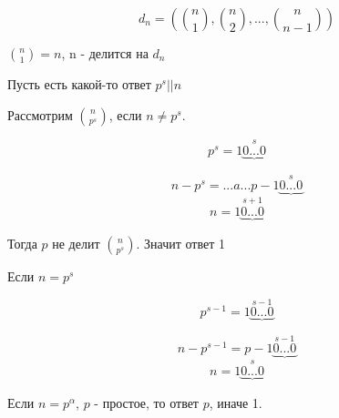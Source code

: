 
$$d_n = \left(\binom{n}{1}, \binom{n}{2}, ..., \binom{n}{n - 1}\right)$$

$\binom{n}{1} = n$, n - делится на $d_n$

Пусть есть какой-то ответ $p^s||n$

Рассмотрим $\binom{n}{p^s}$, если $n \neq p^s$.

$$p^s = 1\underbrace{0...0}^{s}$$

$$n - p^s = ... a ... p - 1\underbrace{0...0}^{s}$$
$$n = 1\underbrace{0...0}^{s + 1}$$

Тогда $p$ не делит $\binom{n}{p^s}$. Значит ответ 1

Если $n = p^s$

$$p^{s - 1} = 1\underbrace{0...0}^{s - 1}$$

$$n - p^{s - 1} = p - 1\underbrace{0...0}^{s - 1}$$
$$n = 1\underbrace{0...0}^{s}$$

Если $n = p^{\alpha}$, $p$ - простое, то ответ $p$, иначе 1.
